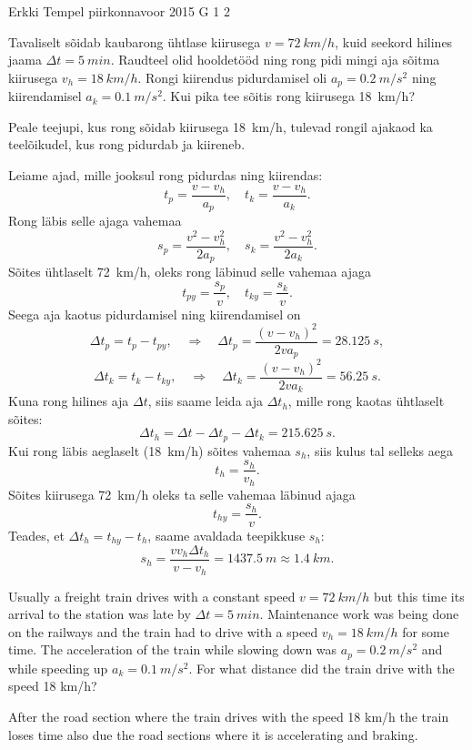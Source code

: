 {Erkki Tempel} %
{piirkonnavoor} %
{2015} %
{G 1} %
{2} %
{
\ifStatement
Tavaliselt sõidab kaubarong ühtlase kiirusega $v=\SI{72}{km/h}$, kuid seekord hilines jaama $\Delta t=\SI{5}{min}$. Raudteel olid hooldetööd ning rong pidi mingi aja sõitma kiirusega $v_{h}=\SI{18}{km/h}$. Rongi kiirendus pidurdamisel oli $a_p=\SI{0,2}{m/s^2}$ ning kiirendamisel $a_k=\SI{0,1}{m/s^2}$. Kui pika tee sõitis rong kiirusega \SI{18}{km/h}?
\fi


\ifHint
Peale teejupi, kus rong sõidab kiirusega \SI{18}{km/h}, tulevad rongil ajakaod ka teelõikudel, kus rong pidurdab ja kiireneb.
\fi


\ifSolution
Leiame ajad, mille jooksul rong pidurdas ning kiirendas:
\[ t_p = \frac{v - v_h}{a_p},\quad t_k = \frac{v-v_h}{a_k}. \]
Rong läbis selle ajaga vahemaa
\[ s_p = \frac{v^2-v_h^2}{2a_p}, \quad s_k = \frac{v^2-v_h^2}{2a_k}. \]
Sõites ühtlaselt \SI{72}{km/h}, oleks rong läbinud selle vahemaa ajaga
\[ t_{py} = \frac{s_p}{v},\quad t_{ky} =\frac{s_k}{v}. \]
Seega aja kaotus pidurdamisel ning kiirendamisel on 
\[ \Delta t_p =  t_{p} - t_{py}, \quad\Rightarrow\quad \Delta t_p = \frac{(v-v_h)^2}{2va_p}=\SI{28,125}{s},\]
\[ \Delta t_k =  t_{k} - t_{ky}, \quad\Rightarrow\quad \Delta t_k = \frac{(v-v_h)^2}{2va_k}=\SI{56,25}{s}.\]
Kuna rong hilines aja $\Delta t$, siis saame leida aja $\Delta t_h$, mille rong kaotas ühtlaselt sõites:
\[ \Delta t_h = \Delta t - \Delta t_p - \Delta t_k = \SI{215,625}{s}. \]
Kui rong läbis aeglaselt (\SI{18}{km/h}) sõites vahemaa $s_h$, siis kulus tal selleks aega
\[ t_h = \frac{s_h}{v_h}. \]
Sõites kiirusega \SI{72}{km/h} oleks ta selle vahemaa läbinud ajaga
\[ t_{hy} = \frac{s_h}{v}. \]
Teades, et $\Delta t_h = t_{hy} - t_h$, saame avaldada teepikkuse $s_h$:
\[ s_h = \frac{vv_h\Delta t_h}{v-v_h} = \SI{1437,5}{m} \approx \SI{1,4}{km}.\] 
\fi


\ifEngStatement
Usually a freight train drives with a constant speed $v=\SI{72}{km/h}$ but this time its arrival to the station was late by $\Delta t=\SI{5}{min}$. Maintenance work was being done on the railways and the train had to drive with a speed $v_{h}=\SI{18}{km/h}$ for some time. The acceleration of the train while slowing down was $a_p=\SI{0,2}{m/s^2}$ and while speeding up $a_k=\SI{0,1}{m/s^2}$. For what distance did the train drive with the speed 18 km/h?
\fi


\ifEngHint
After the road section where the train drives with the speed 18 km/h the train loses time also due the road sections where it is accelerating and braking.
\fi


}
